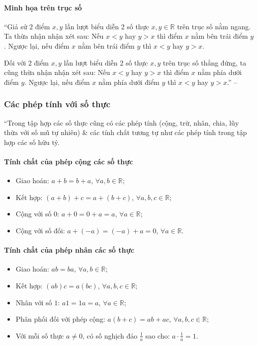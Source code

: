 \documentclass{article}
\numberwithin{equation}{section}
\begin{document}
\paragraph{Minh họa trên trục số}
``Giả sử 2 điểm $x,y$ lần lượt biểu diễn 2 số thực $x,y\in\mathbb{R}$ trên trục số nằm ngang. Ta thừa nhận nhận xét sau: Nếu $x < y$ hay $y > x$ thì điểm $x$ nằm bên trái điểm $y$. Ngược lại, nếu điểm $x$ nằm bên trái điểm $y$ thì $x < y$ hay $y > x$.

Đối với 2 điểm $x,y$ lần lượt biểu diễn 2 số thực $x,y$ trên trục số thẳng đứng, ta cũng thừa nhận nhận xét sau: Nếu $x < y$ hay $y > x$ thì điểm $x$ nằm phía dưới điểm $y$. Ngược lại, nếu điểm $x$ nằm phía dưới điểm $y$ thì $x < y$ hay $y > x$.'' -- \cite[p. 41]{SGK_Toan_7_Canh_Dieu_tap_1}

\subsubsection{Các phép tính với số thực}
``Trong tập hợp các số thực cũng có các phép tính (cộng, trừ, nhân, chia, lũy thừa với số mũ tự nhiên) \& các tính chất tương tự như các phép tính trong tập hợp các số hữu tỷ.

\paragraph{Tính chất của phép cộng các số thực}
\begin{itemize}
	\item Giao hoán: $a + b = b + a$, $\forall a,b\in\mathbb{R}$;
	\item Kết hợp: $(a + b) + c = a + (b + c)$, $\forall a,b,c\in\mathbb{R}$;
	\item Cộng với số $0$: $a + 0 = 0 + a = a$, $\forall a\in\mathbb{R}$;
	\item Cộng với số đối: $a + (-a) = (-a) + a = 0$, $\forall a\in\mathbb{R}$.
\end{itemize}

\paragraph{Tính chất của phép nhân các số thực}
\begin{itemize}
	\item Giao hoán: $ab = ba$, $\forall a,b\in\mathbb{R}$;
	\item Kết hợp: $(ab)c = a(bc)$, $\forall a,b,c\in\mathbb{R}$;
	\item Nhân với số $1$: $a1 = 1a = a$, $\forall a\in\mathbb{R}$;
	\item Phân phối đối với phép cộng: $a(b + c) = ab + ac$, $\forall a,b,c\in\mathbb{R}$;
	\item Với mỗi số thực $a\ne 0$, có số nghịch đảo $\frac{1}{a}$ sao cho: $a\cdot\frac{1}{a} = 1$.
\end{itemize}
\end{document}
